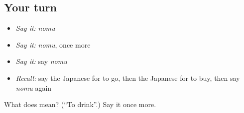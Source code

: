 \subsection*{Your turn}
\begin{itemize}
\raggedright
  \item \emph{Say it:} \emph{nomu}
  \item \emph{Say it:} \emph{nomu}, once more
  \item \emph{Say it:} say \emph{nomu}
  \item \emph{Recall:} say the Japanese for to go, then the Japanese for to buy, then say \emph{nomu} again
\end{itemize}

\begin{tcolorbox}[breakable,colback=teal!4,colframe=teal!35!black,title={Before you move on}]
What does  mean? (\textquotedblleft{}To drink\textquotedblright{}.) Say it once more.
\end{tcolorbox}
